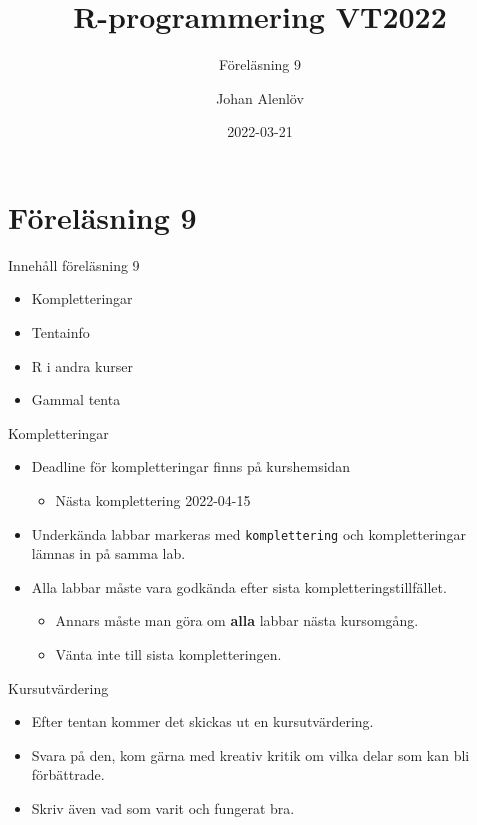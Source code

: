\documentclass[
  11pt,
  ignorenonframetext,
  handout]{beamer}
\title{R-programmering VT2022}
\subtitle{Föreläsning 9}
\author{Johan Alenlöv}
\date{2022-03-21}
\institute{Linköpings Universitet}
\providecommand{\tightlist}{%
  \setlength{\itemsep}{0pt}\setlength{\parskip}{0pt}}
\begin{document}
\frame{\titlepage}

\hypertarget{fuxf6reluxe4sning-9}{%
\section{Föreläsning 9}\label{fuxf6reluxe4sning-9}}

\begin{frame}{Innehåll föreläsning 9}
\protect\hypertarget{innehuxe5ll-fuxf6reluxe4sning-9}{}
\begin{itemize}
\tightlist
\item
  Kompletteringar
\item
  Tentainfo
\item
  R i andra kurser
\item
  Gammal tenta
\end{itemize}
\end{frame}

\begin{frame}[fragile]{Kompletteringar}
\protect\hypertarget{kompletteringar}{}
\begin{itemize}
\tightlist
\item
  Deadline för kompletteringar finns på kurshemsidan

  \begin{itemize}
  \tightlist
  \item
    Nästa komplettering 2022-04-15
  \end{itemize}
\item
  Underkända labbar markeras med \texttt{komplettering} och
  kompletteringar lämnas in på samma lab.
\item
  Alla labbar måste vara godkända efter sista kompletteringstillfället.

  \begin{itemize}
  \tightlist
  \item
    Annars måste man göra om \textbf{alla} labbar nästa kursomgång.
  \item
    Vänta inte till sista kompletteringen.
  \end{itemize}
\end{itemize}
\end{frame}

\begin{frame}{Kursutvärdering}
\protect\hypertarget{kursutvuxe4rdering}{}
\begin{itemize}
\tightlist
\item
  Efter tentan kommer det skickas ut en kursutvärdering.
\item
  Svara på den, kom gärna med kreativ kritik om vilka delar som kan bli
  förbättrade.
\item
  Skriv även vad som varit och fungerat bra.
\end{itemize}
\end{frame}
\end{document}
